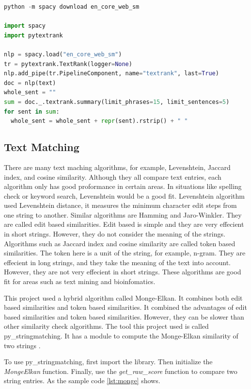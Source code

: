 \begin{lstlisting}[language=Python, label={lst:textrank}, caption=Pytextrank Sample Code]
python -m spacy download en_core_web_sm

import spacy
import pytextrank

nlp = spacy.load("en_core_web_sm")
tr = pytextrank.TextRank(logger=None)
nlp.add_pipe(tr.PipelineComponent, name="textrank", last=True)
doc = nlp(text)
whole_sent = ""
sum = doc._.textrank.summary(limit_phrases=15, limit_sentences=5)
for sent in sum:
  whole_sent = whole_sent + repr(sent).rstrip() + " "
\end{lstlisting}

\subsection{Text Matching}

There are many text maching algorithms, for example, Levenshtein, Jaccard index,
and cosine similarity. Although they all compare text entries, each algorithm only
has good proformance in certain areas. In situations like spelling check or keyword
search, Levenshtein would be a good fit. Levenshtein algorithm used Levenshtein
distance, it measures the minimum character edit steps from one string to another.
Similar algorithms are Hamming and Jaro-Winkler. They are called edit based similarities.
Edit based is simple and they are very effecient in short strings. However, they
do not consider the meaning of the strings. Algorithms such as Jaccard index and
cosine similarity are called token based similarities. The token here is a unit
of the string, for example, n-gram. They are effecient in long strings, and they
take the meaning of the text into account. However, they are not very effecient
in short strings. These algorithms are good fit for areas such as text mining and
bioinfomatics.

This project used a hybrid algorithm called Monge-Elkan. It combines both edit
based similarities and token based similarities. It combined the advantages of edit
based similarities and token based similarities. However, they can be slower than
other similarity check algorithms. The tool this project used is called py\_stringmatching.
It has a module to compute the Monge-Elkan similarity of two strings \cite{matching}.

To use py\_stringmatching, first import the library. Then initialize the \emph{MongeElkan}
function. Finally, use the \emph{get\_raw\_score} function to compare two string
entries. As the sample code \ref{lst:monge} shows.

